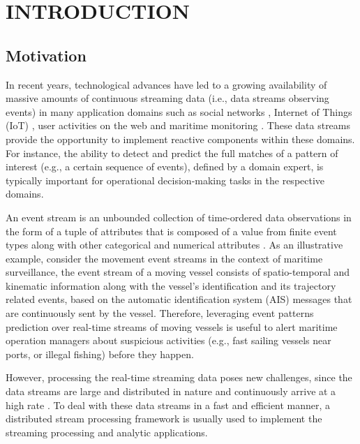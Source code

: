 \chapter{INTRODUCTION}


\section{Motivation}
\par In recent years, technological advances have led to a growing availability of massive amounts of continuous streaming data (i.e., data streams observing events) in many application domains such as social networks \cite{reuter2012event,mathioudakis2010twittermonitor}, Internet of Things (IoT) \cite{miorandi2012internet}, user activities on the web \cite{banerjee2001clickstream,metwally2005duplicate} and maritime monitoring \cite{patroumpas2015event,laxhammar2010conformal}. These data streams provide the opportunity to implement reactive components within these domains.  For instance, the ability to detect and predict the full matches of a pattern of interest (e.g., a certain sequence of events), defined by a domain expert, is typically important for operational decision-making tasks in the respective domains.

\par An event stream is an unbounded collection of time-ordered data observations in the form of a tuple of attributes that is composed of a value from finite event types along with other categorical and numerical attributes \cite{agrawal2008efficient,schultz2009distributed,zhou_pattern_2015}. As an illustrative example, consider the movement event streams in the context of maritime surveillance, the event stream of a moving vessel consists of spatio-temporal and kinematic information along with the vessel's identification and its trajectory related events, based on the automatic identification system (AIS) \cite{ais} messages that are continuously sent by the vessel. Therefore, leveraging event patterns prediction over real-time streams of moving vessels is useful to alert maritime operation managers about suspicious activities (e.g., fast sailing vessels near ports, or illegal fishing) before they happen. 

\par However, processing the real-time streaming data poses new challenges, since the data streams are large and distributed in nature and continuously arrive at a high rate \cite{Babcock2002,Flouris2017}. To deal with these data streams in a fast and efficient manner, a distributed stream processing framework \cite{Spark,Flink,Storm} is usually used to implement the streaming processing and analytic applications. 


